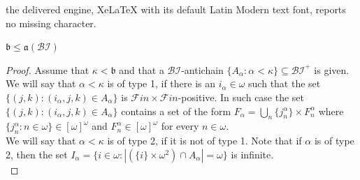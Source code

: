 \documentclass[10pt,a4paper]{amsart}
\newcommand{\BI}{\mathcal{BI}}
\newcommand{\FF}{\mathcal{F}in\times\mathcal{F}in}
\newcommand{\aaa}{\mathfrak{a}}
\newcommand{\bbb}{\mathfrak{b}}
\begin{document}
the delivered engine, XeLaTeX with its default Latin Modern text font, reports no missing character.
\begin{theorem}\label{bbbLeqAAABi}
    $\bbb\leq\aaa(\BI)$
\end{theorem}

\begin{proof}
    Assume that $\kappa<\bbb$ and that a $\BI$-antichain $\{A_{\alpha}:\alpha<\kappa\}\subseteq\BI^{+}$ is given.\\
    We will say that $\alpha<\kappa$ is of type 1, if there is an $i_{\alpha}\in\omega$ such that the set $\{(j,k):(i_{\alpha},j,k)\in A_{\alpha}\}$ is $\FF$-positive. In such case the set $\{(j,k):(i_{\alpha},j,k)\in A_{\alpha}\}$ contains a set of the form $F_{\alpha}=\bigcup_{n}\{j^{\alpha}_{n}\}\times F^{\alpha}_{n}$ where $\{j^{\alpha}_{n}:n\in\omega\}\in[\omega]^{\omega}$ and $F^{\alpha}_{n}\in[\omega]^{\omega}$ for every $n\in\omega$.\\
    We will say that $\alpha<\kappa$ is of type 2, if it is not of type 1. Note that if $\alpha$ is of type 2, then the set $I_{\alpha}=\{i\in\omega:|(\{i\}\times\omega^{2})\cap A_{\alpha}|=\omega\}$ is infinite.\\
    

\end{proof}
\end{document}
